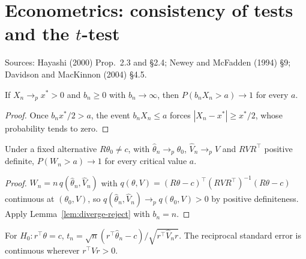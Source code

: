 \chapter{Econometrics: consistency of tests and the \texorpdfstring{$t$}{t}-test}
\label{chap:econometrics9}

Sources: Hayashi (2000) Prop.~2.3 and \S2.4; Newey and McFadden (1994) \S9; Davidson and MacKinnon (2004) \S4.5.

\begin{lemma}
\label{lem:diverge-reject}
\leanok
If $X_n\to_p x^* > 0$ and $b_n\ge0$ with $b_n\to\infty$, then $P(b_nX_n > a)\to1$ for every $a$.
\end{lemma}
\begin{proof}
\leanok
Once $b_nx^*/2 > a$, the event $b_nX_n\le a$ forces $|X_n - x^*|\ge x^*/2$, whose probability tends to zero.
\end{proof}

\begin{theorem}
\label{thm:wald-consistent}
\leanok
{}
Under a fixed alternative $R\theta_0\ne c$, with $\hat\theta_n\to_p\theta_0$, $\hat V_n\to_p V$ and $RVR^\top$ positive
definite, $P(W_n > a)\to1$ for every critical value $a$.
\end{theorem}
\begin{proof}
\leanok
$W_n = n\,q(\hat\theta_n,\hat V_n)$ with $q(\theta,V) = (R\theta-c)^\top(RVR^\top)^{-1}(R\theta-c)$ continuous at
$(\theta_0,V)$, so $q(\hat\theta_n,\hat V_n)\to_p q(\theta_0,V) > 0$ by positive definiteness. Apply
Lemma~\ref{lem:diverge-reject} with $b_n = n$.
\end{proof}

\begin{definition}[$t$ statistic]
\label{def:t-stat}
\leanok
For $H_0: r^\top\theta = c$, $t_n = \sqrt n(r^\top\hat\theta_n-c)/\sqrt{r^\top\hat V_nr}$. The reciprocal standard error
is continuous wherever $r^\top Vr > 0$.
\end{definition}


